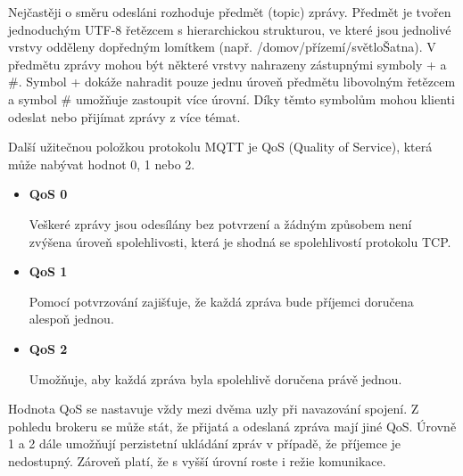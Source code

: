   Nejčastěji o směru odesláni rozhoduje předmět (topic) zprávy. Předmět je tvořen
  jednoduchým UTF-8 řetězcem s hierarchickou strukturou, ve které jsou jednolivé
  vrstvy odděleny dopředným lomítkem (např. /domov/přízemí/světloŠatna). V předmětu
  zprávy mohou být některé vrstvy nahrazeny zástupnými symboly + a \#. Symbol + dokáže
  nahradit pouze jednu úroveň předmětu libovolným řetězcem a symbol \# umožňuje
  zastoupit více úrovní. Díky těmto symbolům mohou klienti odeslat nebo přijímat
  zprávy z více témat.
  
  Další užitečnou položkou protokolu MQTT je QoS (Quality of Service),
  která může nabývat hodnot 0, 1 nebo 2.
  
   \begin{itemize}
    \item \textbf{QoS 0}
    
    Veškeré zprávy jsou odesílány bez potvrzení a žádným způsobem
    není zvýšena úroveň spolehlivosti, která je shodná se spolehlivostí protokolu TCP.
    
    \item \textbf{QoS 1}
    
    Pomocí potvrzování zajišťuje, že každá zpráva bude příjemci doručena alespoň jednou.
    
    \item \textbf{QoS 2}
    
     Umožňuje, aby každá zpráva byla spolehlivě doručena právě jednou.
   \end{itemize}
  Hodnota QoS se nastavuje vždy mezi dvěma uzly při navazování spojení.
  Z pohledu brokeru se může stát, že přijatá a odeslaná zpráva mají jiné QoS.
  Úrovně 1 a 2 dále umožňují perzistetní ukládání zpráv v případě, že příjemce je
  nedostupný. Zároveň platí, že s vyšší úrovní roste i režie komunikace. \cite{mqtt_intro}
